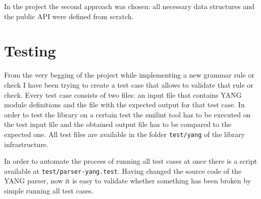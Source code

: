 \documentclass[conference]{IEEEtran}
\begin{document}
In the project the second approach was chosen: all necessary data structures and the public API were defined from scratch.

\section{Testing}
From the very begging of the project  while implementing a new grammar rule or check I have been trying to create a test case that allows to validate that rule or check. Every test case consists of two files: an input file that contains YANG module definitions and the file with the expected output for that test case. In order to test the library on a certain test the smilint tool has to be executed on the test input file and the obtained output file has to be compared to the expected one. All test files are available in the folder 	\texttt{test/yang} of the library infrastructure.

In order to automate the process of running all test cases at once there is a script available at \texttt{test/parser-yang.test}. Having changed the source code of the YANG parser, now it is easy to validate whether something has been broken by simple running all test cases.
\end{document}
